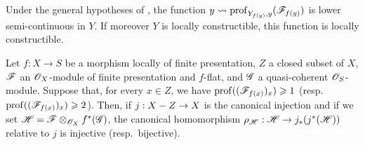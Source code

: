 
\begin{corollary}[19.9.7]
\label{IV.19.9.7}
Under the general hypotheses of , the function $y\leadsto\operatorname{prof}_{Y_{f(y)},y}(\mathscr{F}_{f(y)})$ is lower semi-continuous in $Y$.
If moreover $Y$ is locally constructible, this function is locally constructible.
\end{corollary}

\begin{proposition}[19.9.8]
\label{IV.19.9.8}
Let $f:X\to S$ be a morphism locally of finite presentation, $Z$ a closed subset of $X$, $\mathscr{F}$ an $\mathscr{O}_X$-module of finite presentation and $f$-flat, and $\mathscr{G}$ a quasi-coherent $\mathscr{O}_S$-module.
Suppose that, for every $x\in Z$, we have $\operatorname{prof}((\mathscr{F}_{f(x)})_x)\geqslant 1$ \textup{(resp.\ $\operatorname{prof}((\mathscr{F}_{f(x)})_x)\geqslant 2$)}.
Then, if $j:X- Z\to X$ is the canonical injection and if we set $\mathscr{H}=\mathscr{F}\otimes_{\mathscr{O}_X}f^*(\mathscr{G})$, the canonical homomorphism $\rho_{\mathscr{H}}:\mathscr{H}\to j_*(j^*(\mathscr{H}))$ relative to $j$ is injective \textup{(resp.}\ bijective\textup{)}.
\end{proposition}

